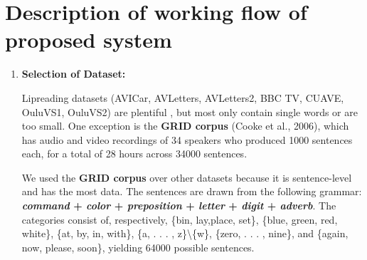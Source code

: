 \section{Description of working flow of proposed system}
\begin{enumerate}
  
    \item \textbf{\large Selection of Dataset:}

    
    Lipreading datasets (AVICar, AVLetters, AVLetters2, BBC TV, CUAVE, OuluVS1, OuluVS2) are plentiful \cite{zhou2014review}\cite{chung2017lip}, but most only contain single words or are too small. One exception is the \textbf{GRID corpus} (Cooke et al., 2006), which has audio and video recordings of 34 speakers who produced 1000 sentences each, for a total of 28 hours across 34000 sentences.

    We used the \textbf{GRID corpus} over other datasets because it is sentence-level and has the most data. The sentences are drawn from the following grammar: \textbf{\textit{command} + \textit{color} + \textit{preposition} + \textit{letter} + \textit{digit} + \textit{adverb}}. The categories consist of, respectively, \{bin, lay,place, set\}, \{blue, green, red, white\}, \{at, by, in, with\}, \{a, . . . , z\}\textbackslash\{w\}, \{zero, . . . , nine\}, and \{again, now, please, soon\}, yielding 64000 possible sentences.


\end{enumerate}
